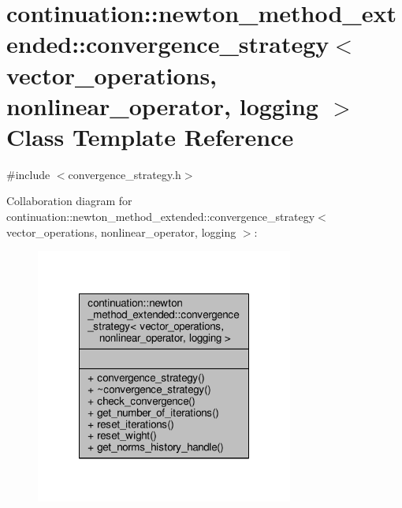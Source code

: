 \hypertarget{classcontinuation_1_1newton__method__extended_1_1convergence__strategy}{\section{continuation\-:\-:newton\-\_\-method\-\_\-extended\-:\-:convergence\-\_\-strategy$<$ vector\-\_\-operations, nonlinear\-\_\-operator, logging $>$ Class Template Reference}
\label{classcontinuation_1_1newton__method__extended_1_1convergence__strategy}
}


{\ttfamily \#include $<$convergence\-\_\-strategy.\-h$>$}



Collaboration diagram for continuation\-:\-:newton\-\_\-method\-\_\-extended\-:\-:convergence\-\_\-strategy$<$ vector\-\_\-operations, nonlinear\-\_\-operator, logging $>$\-:
\nopagebreak
\begin{figure}[H]
\begin{center}
\leavevmode
\includegraphics[width=240pt]{classcontinuation_1_1newton__method__extended_1_1convergence__strategy__coll__graph}
\end{center}
\end{figure}
